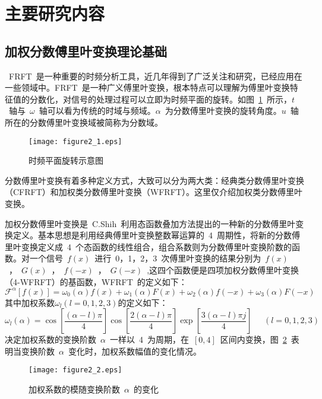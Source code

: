 
\section{主要研究内容}
\subsection{加权分数傅里叶变换理论基础}

~FRFT~是一种重要的时频分析工具，近几年得到了广泛关注和研究，已经应用在一些领域中。FRFT~是一种广义傅里叶变换，根本特点可以理解为傅里叶变换特征值的分数化，对信号的处理过程可以立即为时频平面的旋转。如图~\ref{shipinxuanzhuan}~所示，$t$~轴与~$\omega$~轴可以看为传统的时域与频域。$\alpha$~为分数傅里叶变换的旋转角度。$u$~轴所在的分数傅里叶变换域被简称为分数域。
\begin{figure}[htbp]
\centering
\texttt{[image: figure2\_1.eps]}
\caption{时频平面旋转示意图}\vspace{-1em}\label{shipinxuanzhuan}
\end{figure}

分数傅里叶变换有着多种定义方式，大致可以分为两大类：经典类分数傅里叶变换（CFRFT）和加权类分数傅里叶变换（WFRFT）。这里仅介绍加权类分数傅里叶变换。

加权分数傅里叶变换是~C.Shih~利用态函数叠加方法提出的一种新的分数傅里叶变换定义。基本思想是利用经典傅里叶变换整数幂运算的~4~周期性，将新的分数傅里叶变换定义成~4~个态函数的线性组合，组合系数则为分数傅里叶变换阶数的函数。对一个信号~$f(x)$~进行~0，1，2，3~次傅里叶变换的结果分别为~$f(x)$~，~$G(x)$~，~$f(-x)$~，~$G(-x)$~,这四个函数便是四项加权分数傅里叶变换（4-WFRFT）的基函数，WFRFT~的定义如下：
\begin{equation}
{\mathcal{F}^\alpha }\left[ {f\left( x \right)} \right] = {\omega _0}\left( \alpha  \right)f\left( x \right) + {\omega _1}\left( \alpha  \right)F\left( x \right) + {\omega _2}\left( \alpha  \right)f\left( { - x} \right) + {\omega _3}\left( \alpha  \right)F\left( { - x} \right)
\end{equation}
其中加权系数${\omega _l}(l = 0,1,2,3)$的定义如下：
\begin{equation}\label{jiaquanxishu}
{\omega _l}(\alpha ) = \cos \left[ {\frac{{(\alpha  - l)\pi }}{4}} \right]\cos \left[ {\frac{{2(\alpha  - l)\pi }}{4}} \right]\exp \left[ {\frac{{3(\alpha  - l)\pi j}}{4}} \right]\;\;\;\;\;(l = 0,1,2,3)
\end{equation}
决定加权系数的变换阶数~$\alpha$~一样以~4~为周期，在~$[0,4]$~区间内变换，图~\ref{xishubianhua}~表明当变换阶数~$\alpha$~变化时，加权系数幅值的变化情况。
\begin{figure}[htbp]
\centering
\texttt{[image: figure2\_2.eps]}
\caption{加权系数的模随变换阶数~$\alpha$~的变化}\vspace{-1em}\label{xishubianhua}
\end{figure}

